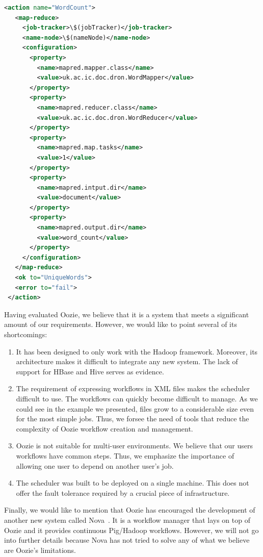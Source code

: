 \documentclass[11pt,a4paper,twoside]{report}
\begin{document}
\begin{lstlisting}[caption={Example of an Oozie MapReduce Job},
label={lst:OozieMR}, language=XML]
 <action name="WordCount">
   <map-reduce>
     <job-tracker>\$(jobTracker)</job-tracker>
     <name-node>\$(nameNode)</name-node>
     <configuration>
       <property>
         <name>mapred.mapper.class</name>
         <value>uk.ac.ic.doc.dron.WordMapper</value>
       </property>
       <property>
         <name>mapred.reducer.class</name>
         <value>uk.ac.ic.doc.dron.WordReducer</value>
       </property>
       <property>
         <name>mapred.map.tasks</name>
         <value>1</value>
       </property>
       <property>
         <name>mapred.intput.dir</name>
         <value>document</value>
       </property>
       <property>
         <name>mapred.output.dir</name>
         <value>word_count</value>
       </property>
     </configuration>
   </map-reduce>
   <ok to="UniqueWords">
   <error to="fail">
 </action>
\end{lstlisting}


Having evaluated Oozie, we believe that it is a system that meets a significant amount of our requirements. However, we would like to point several of its shortcomings:

\begin{enumerate}
\item{}
It has been designed to only work with the Hadoop framework. Moreover, its architecture makes it difficult to integrate any new system. The lack of support for HBase and Hive serves as evidence.
\item{}
The requirement of expressing workflows in XML files makes the scheduler difficult to use. The workflows can quickly become difficult to manage. As we could see in the example we presented, files grow to a considerable size even for the most simple jobs. Thus, we forsee the need of tools that reduce the complexity of Oozie workflow creation and management.
\item{}
Oozie is not suitable for multi-user environments. We believe that our users workflows have common steps. Thus, we emphasize the importance of allowing one user to depend on another user's job.
\item{}
The scheduler was built to be deployed on a single machine. This does not offer the fault tolerance required by a crucial piece of infrastructure.
\end{enumerate}

Finally, we would like to mention that Oozie has encouraged the development of another new system called Nova~\cite{Nova}. It is a workflow manager that lays on top of Oozie and it provides continuous Pig/Hadoop workflows. However, we will not go into further details because Nova has not tried to solve any of what we believe are Oozie's limitations. 
\end{document}
